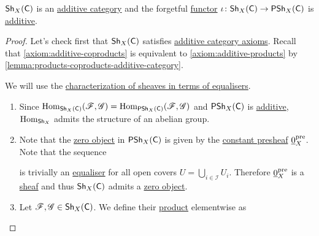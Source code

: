 \documentclass[../../main]{subfiles}
\begin{document}
\begin{lemma}\label{lemma:sheaves-category-is-additive}
  \(\mathsf{Sh}_{X}(\mathsf{C})\) is an \hyperref[def:additive-category]{additive category} and the forgetful \hyperref[def:functor]{functor} \(\iota\colon \mathsf{Sh}_{X}(\mathsf{C}) \to \mathsf{PSh}_{X}(\mathsf{C})\) is \hyperref[def:additive-functor]{additive}.
\end{lemma}
\begin{proof}
  Let's check first that \(\mathsf{Sh}_{X}(\mathsf{C})\) satisfies \hyperref[def:additive-category]{additive category axioms}.
  Recall that \ref{axiom:additive-coproducts} is equivalent to \ref{axiom:additive-products} by \autoref{lemma:products-coproducts-additive-category}.

  We will use the \hyperref[rem:sheaves-as-equalisers]{characterization of sheaves in terms of equalisers}.
  \begin{enumerate}
    \item[\ref{axiom:additive-hom}] Since \(\operatorname{Hom}_{\mathsf{Sh}_{X}(\mathsf{C})}(\mathscr{F}, \mathscr{G}) = \operatorname{Hom}_{\mathsf{PSh}_{X}(\mathsf{C})}(\mathscr{F}, \mathscr{G})\) and \(\mathsf{PSh}_{X}(\mathsf{C})\) is \hyperref[def:additive-category]{additive}, \(\operatorname{Hom}_{\mathsf{Sh}_{X}}\) admits the structure of an abelian group.
    \item[\ref{axiom:additive-zero}] Note that the \hyperref[def:zero-object]{zero object} in \(\mathsf{PSh}_{X}(\mathsf{C})\) is given by the \hyperref[def:constant-presheaf]{constant presheaf} \(\underline{0}_{X}^{\operatorname*{pre}}\).
          Note that the sequence
          \begin{center}
          \end{center}
          is trivially an \hyperref[def:equaliser]{equaliser} for all open covers \(U = \bigcup_{i \in \mathcal{I}} U_{i}\).
          Therefore \(\underline{0}_{X}^{\operatorname*{pre}}\) is a \hyperref[def:sheaf]{sheaf} and thus \(\mathsf{Sh}_{X}(\mathsf{C})\) admits a \hyperref[def:zero-object]{zero object}.
    \item[\ref{axiom:additive-products}] Let \(\mathscr{F}, \mathscr{G} \in \mathsf{Sh}_{X}(\mathsf{C})\).
          We define their \hyperref[def:categorical-product]{product} elementwise as

\end{enumerate}
\end{proof}
\end{document}
